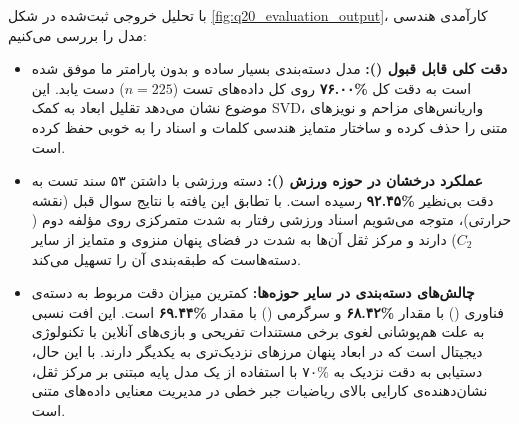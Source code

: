\documentclass{article}
\begin{document}
    با تحلیل خروجی ثبت‌شده در شکل \ref{fig:q20_evaluation_output}، کارآمدی هندسی مدل را بررسی می‌کنیم:
    \begin{itemize}
        \item \textbf{دقت کلی قابل قبول ():}
        مدل دسته‌بندی بسیار ساده و بدون پارامتر ما موفق شده است به دقت کل \textbf{\%۷۶.۰۰} روی کل داده‌های تست ($n=225$) دست یابد. این موضوع نشان می‌دهد تقلیل ابعاد به کمک SVD، واریانس‌های مزاحم و نویزهای متنی را حذف کرده و ساختار متمایز هندسی کلمات و اسناد را به خوبی حفظ کرده است.

        \item \textbf{عملکرد درخشان در حوزه ورزش ():}
        دسته ورزشی با داشتن ۵۳ سند تست به دقت بی‌نظیر \textbf{\%۹۲.۴۵} رسیده است. با تطابق این یافته با نتایج سوال قبل (نقشه حرارتی)، متوجه می‌شویم اسناد ورزشی رفتار به شدت متمرکزی روی مؤلفه دوم ($C_2$) دارند و مرکز ثقل آن‌ها به شدت در فضای پنهان منزوی و متمایز از سایر دسته‌هاست که طبقه‌بندی آن را تسهیل می‌کند.

        \item \textbf{چالش‌های دسته‌بندی در سایر حوزه‌ها:}
        کمترین میزان دقت مربوط به دسته‌‌ی فناوری () با مقدار \textbf{\%۶۸.۴۲} و سرگرمی () با مقدار \textbf{\%۶۹.۴۴} است. این افت نسبی به علت هم‌پوشانی لغوی برخی مستندات تفریحی و بازی‌های آنلاین با تکنولوژی دیجیتال است که در ابعاد پنهان مرزهای نزدیک‌تری به یکدیگر دارند. با این حال، دستیابی به دقت نزدیک به \%۷۰ با استفاده از یک مدل پایه مبتنی بر مرکز ثقل، نشان‌دهنده‌ی کارایی بالای ریاضیات جبر خطی در مدیریت معنایی داده‌های متنی است.
    \end{itemize}
\end{document}
